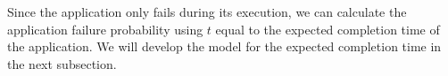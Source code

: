 Since the application only fails during its execution, we can calculate the application failure probability using $t$ equal to the expected completion time of the application. We will develop the model for the expected completion time in the next subsection.

